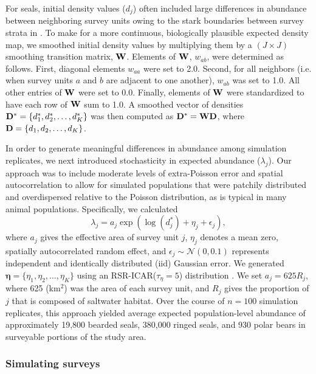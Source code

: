\documentclass[]{rsos}%
\begin{document}
For seals, initial density values ($d_j$) often included large differences in abundance between neighboring survey units owing to the stark boundaries between survey strata in \cite{Bengtson2005}.  To make for a more continuous, biologically plausible expected density map, we smoothed initial density values by multiplying them by a $(J \times J)$ smoothing transition matrix, ${\bf W}$.  Elements of ${\bf W}$, $w_{ab}$, were determined as follows.  First, diagonal elements $w_{aa}$ were set to 2.0.  Second, for all neighbors (i.e. when survey units $a$ and $b$ are adjacent to one another), $w_{ab}$ was set to 1.0.  All other entries of ${\bf W}$ were set to 0.0.  Finally, elements of ${\bf W}$ were standardized to have each row of ${\bf W}$ sum to 1.0.  A smoothed vector of densities ${\bf D}^* = \{ d_1^*, d_2^*, \hdots, d_K^* \}$ was then computed as ${\bf D}^*={\bf W}{\bf D}$, where ${\bf D} = \{ d_1, d_2, \hdots, d_K \}$.

In order to generate meaningful differences in abundance among simulation replicates, we next introduced stochasticity in expected abundance ($\lambda_j$).  Our approach was to include moderate levels of extra-Poisson error and spatial autocorrelation to allow for simulated populations that were patchily distributed and overdispersed relative to the Poisson distribution, as is typical in many animal populations. Specifically, we calculated
\begin{equation*}
   \lambda_j = a_j \exp \left( \log(d_j^*)+\eta_j+\epsilon_j \right),
\end{equation*}
where $a_j$ gives the effective area of survey unit $j$, $\eta_j$ denotes a mean zero, spatially autocorrelated random effect, and $\epsilon_j \sim \mathcal{N}(0,0.1)$ represents independent and identically distributed (iid) Gaussian error.  We generated $\boldsymbol{\eta} = \{ \eta_1, \eta_2, \hdots, \eta_K \}$ using an RSR-ICAR($\tau_\eta = 5$) distribution \cite{ConnEtAl2014}. We set $a_j = 625R_j$, where 625 (km$^2$) was the area of each survey unit, and $R_j$ gives the proportion of $j$ that is composed of saltwater habitat.  Over the course of $n=100$ simulation replicates, this approach yielded average expected population-level abundance of approximately 19,800 bearded seals, 380,000 ringed seals, and 930 polar bears in surveyable portions of the study area.

\subsubsection{Simulating surveys}
\end{document}
